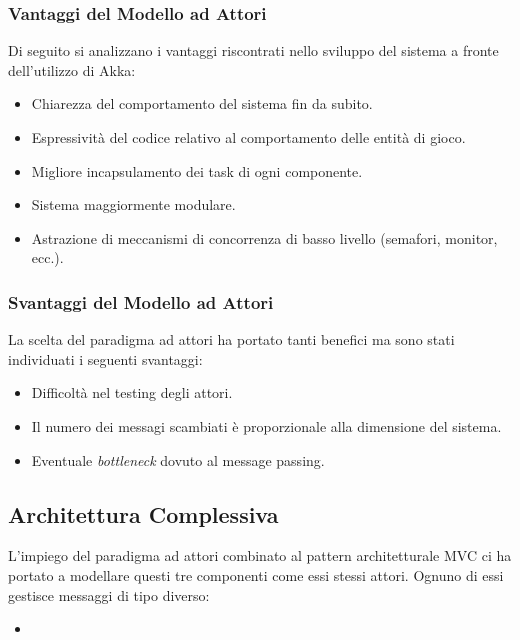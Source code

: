 \subsubsection{Vantaggi del Modello ad Attori}
Di seguito si analizzano i vantaggi riscontrati nello sviluppo del sistema a fronte dell'utilizzo di Akka:
\begin{itemize}
    \item Chiarezza del comportamento del sistema fin da subito.
    \item Espressività del codice relativo al comportamento delle entità di gioco.
    \item Migliore incapsulamento dei task di ogni componente.
    \item Sistema maggiormente modulare.
    \item Astrazione di meccanismi di concorrenza di basso livello (semafori, monitor, ecc.).
\end{itemize}

\subsubsection{Svantaggi del Modello ad Attori}
La scelta del paradigma ad attori ha portato tanti benefici ma sono stati individuati i seguenti svantaggi:
\begin{itemize}
    \item Difficoltà nel testing degli attori.
    \item Il numero dei messagi scambiati è proporzionale alla dimensione del sistema.
    \item Eventuale \textit{bottleneck} dovuto al message passing.
\end{itemize}

\subsection{Architettura Complessiva}
L'impiego del paradigma ad attori combinato al pattern architetturale MVC ci ha portato a modellare questi tre componenti
come essi stessi attori. Ognuno di essi gestisce messaggi di tipo diverso:
\begin{itemize}
    \item
\end{itemize}